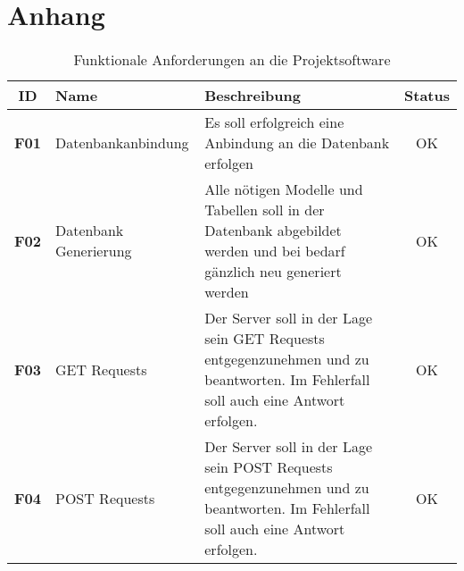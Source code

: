 \section*{Anhang}
\begin{table}[h!]
	\caption{Funktionale Anforderungen an die Projektsoftware}
	\label{tab:funkanf}
	\small
	\begin{tabularx}{\textwidth}{clXc}
	\rowcolor[HTML]{FFFFFF}
	\toprule
	\textbf{ID} & \textbf{Name} & \textbf{Beschreibung}                                                                                                                                                                                                                                                                 & \textbf{Status} \\ \midrule
	\textbf{F01}         & Datenbankanbindung                                        & Es soll erfolgreich eine Anbindung an die Datenbank erfolgen                                                                                                                                                                                                                                                                      & OK \\
	\rowcolor[HTML]{EFEFEF}
	\textbf{F02}         & Datenbank Generierung                                     & Alle nötigen Modelle und Tabellen soll in der Datenbank abgebildet werden und bei bedarf gänzlich neu generiert werden                                                                                                                                                                  & OK              \\
	\rowcolor[HTML]{FFFFFF}
	\textbf{F03}         & GET Requests                                              & Der Server soll in der Lage sein GET Requests entgegenzunehmen und zu beantworten. Im Fehlerfall soll auch eine Antwort erfolgen.                                                                                                                                                      & OK              \\
	\rowcolor[HTML]{EFEFEF}
	\textbf{F04}         & POST Requests                                             & Der Server soll in der Lage sein POST Requests entgegenzunehmen und zu beantworten. Im Fehlerfall soll auch eine Antwort erfolgen.                                                                                                                                            & OK              \\

\end{tabularx}
\end{table}
